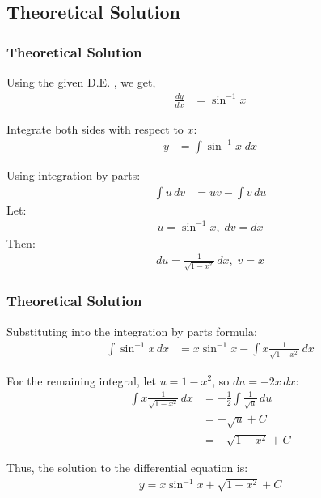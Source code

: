 \documentclass{beamer}
\theoremstyle{remark}
\numberwithin{equation}{section}
\begin{document}
\subsection{Theoretical Solution}
\begin{frame}
\frametitle{Theoretical Solution}
Using the given D.E. , we get,
\begin{align}
    \frac{dy}{dx} &= \sin^{-1}{x}
\end{align}

Integrate both sides with respect to $x$:
\begin{align}
y &= \int \sin^{-1}{x} \; dx
\end{align}

Using integration by parts:
\begin{align}
\int u \, dv &= uv - \int v \, du
\end{align}
Let:
\begin{align}
u = \sin^{-1}{x}, \;  dv = dx
\end{align}
Then:
\begin{align}
du = \frac{1}{\sqrt{1-x^2}} \, dx, \; v = x
\end{align}

\end{frame}
\begin{frame}
\frametitle{Theoretical Solution}
Substituting into the integration by parts formula:
\begin{align}
\int \sin^{-1}{x} \, dx &= x \sin^{-1}{x} - \int x \frac{1}{\sqrt{1-x^2}} \, dx
\end{align}

For the remaining integral, let $ u = 1 - x^2 $, so $ du = -2x \, dx $:
\begin{align}
\int x \frac{1}{\sqrt{1-x^2}} \, dx &= -\frac{1}{2} \int \frac{1}{\sqrt{u}} \, du \\
&= -\sqrt{u} + C \\
&= -\sqrt{1-x^2} + C
\end{align}

Thus, the solution to the differential equation is:
\begin{align}
y = x \sin^{-1}{x} + \sqrt{1-x^2} + C
\end{align}
\end{frame}
\end{document}
